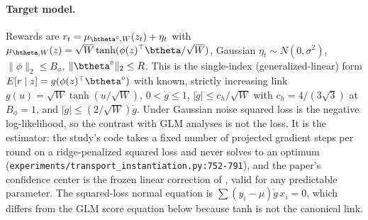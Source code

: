 \paragraph{Target model.} Rewards are $r_t=\mu_{\btheta^\circ,W}(z_t)+\eta_t$ with
$\mu_{\btheta,W}(z)=\sqrt W\tanh(\phi(z)^\top\btheta/\sqrt W)$, Gaussian
$\eta_t\sim N(0,\sigma^2)$, $\|\phi\|_2\le B_\phi$, $\|\btheta^\circ\|_2\le R$.
This is the single-index (generalized-linear) form $E[r\mid z]=g(\phi(z)^\top\btheta^\circ)$
with known, strictly increasing link $g(u)=\sqrt W\tanh(u/\sqrt W)$,
$0<\dot g\le1$, $|\ddot g|\le c_h/\sqrt W$ with $c_h=4/(3\sqrt3)$ at $B_\phi=1$,
and $|\ddot g|\le(2/\sqrt W)\dot g$. Under Gaussian noise squared loss is the
negative log-likelihood, so the contrast with GLM analyses is not the loss.
It is the estimator: the study's code takes a fixed number of projected
gradient steps per round on a ridge-penalized squared loss and never solves to
an optimum (\texttt{experiments/transport\_instantiation.py:752-791}), and the
paper's confidence center is the frozen linear correction of
, valid for any predictable parameter. The
squared-loss normal equation is $\sum(y_i-\mu)\dot g\,x_i=0$, which differs
from the GLM score equation below because tanh is not the canonical link.

